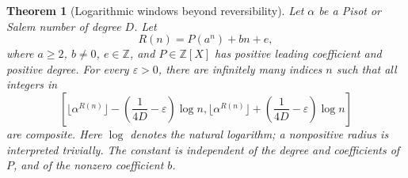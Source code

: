 \documentclass[11pt,a4paper]{article}
\newtheorem{theorem}{Theorem}[section]
\theoremstyle{definition}
\theoremstyle{remark}
\numberwithin{equation}{section}
\begin{document}
\begin{theorem}[Logarithmic windows beyond reversibility]
\label{f13:thm:nonrev-log-windows}
Let $\alpha$ be a Pisot or Salem number of degree $D$.  Let
\[
 R(n)=P(a^n)+bn+e,
\]
where $a\ge2$, $b\ne0$, $e\in\mathbb Z$, and
$P\in\mathbb Z[X]$ has positive leading coefficient and positive degree.
For every $\varepsilon>0$, there are infinitely many indices $n$ such
that all integers in
\[
 \left[
 \lfloor\alpha^{R(n)}\rfloor-
       \left(\frac1{4D}-\varepsilon\right)\log n,
 \lfloor\alpha^{R(n)}\rfloor+
       \left(\frac1{4D}-\varepsilon\right)\log n
 \right]
\]
are composite.  Here $\log$ denotes the natural logarithm; a nonpositive
radius is interpreted trivially.  The constant is independent of the
degree and coefficients of $P$, and of the nonzero coefficient $b$.
\end{theorem}
\end{document}
